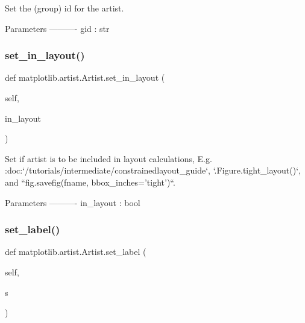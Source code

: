 \begin{DoxyVerb}Set the (group) id for the artist.

Parameters
----------
gid : str
\end{DoxyVerb}
 \mbox{\label{classmatplotlib_1_1artist_1_1Artist_ad584ec289f20e8ec9a80ebad59f988f8}} 
\subsubsection{\texorpdfstring{set\+\_\+in\+\_\+layout()}{set\_in\_layout()}}
{\footnotesize\ttfamily def matplotlib.\+artist.\+Artist.\+set\+\_\+in\+\_\+layout (\begin{DoxyParamCaption}\item[{}]{self,  }\item[{}]{in\+\_\+layout }\end{DoxyParamCaption})}

\begin{DoxyVerb}Set if artist is to be included in layout calculations,
E.g. :doc:`/tutorials/intermediate/constrainedlayout_guide`,
`.Figure.tight_layout()`, and
``fig.savefig(fname, bbox_inches='tight')``.

Parameters
----------
in_layout : bool
\end{DoxyVerb}
 \mbox{\label{classmatplotlib_1_1artist_1_1Artist_a5f421b761e4d02ae717836ad812391e1}} 
\subsubsection{\texorpdfstring{set\+\_\+label()}{set\_label()}}
{\footnotesize\ttfamily def matplotlib.\+artist.\+Artist.\+set\+\_\+label (\begin{DoxyParamCaption}\item[{}]{self,  }\item[{}]{s }\end{DoxyParamCaption})}

